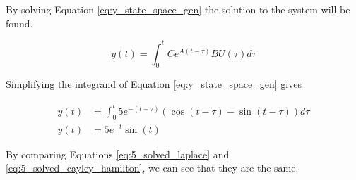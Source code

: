 By solving Equation \ref{eq:y_state_space_gen} the solution to the system will be
found.

\begin{equation} \label{eq:y_state_space_gen}
  y(t) = \int_{0}^{t} C e^{A(t-\tau)} B U(\tau) d \tau
\end{equation}

\noindent Simplifying the integrand of Equation \ref{eq:y_state_space_gen} gives

\begin{align} \label{eq:5_solved_cayley_hamilton}
  y(t) &= \int_{0}^{t} 5e^{-(t-\tau)} (\cos(t-\tau) - \sin(t-\tau)) d \tau \nonumber \\
  y(t) &= 5e^{-t} \sin(t)
\end{align}

\noindent By comparing Equations \ref{eq:5_solved_laplace} and
\ref{eq:5_solved_cayley_hamilton}, we can see that they are the same.



%
